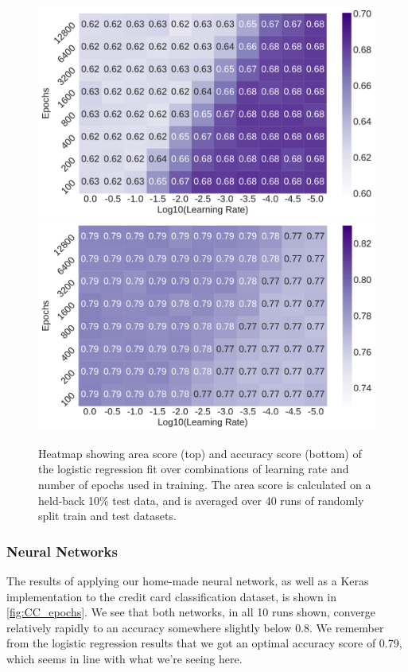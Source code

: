 \documentclass[10pt, twocolumn]{article}
\begin{document}
\begin{figure}[h]
    \centering
    \includegraphics[scale=0.4]{../figs/CC_logreg_area.pdf}
    \includegraphics[scale=0.4]{../figs/CC_logreg_acc.pdf}
    \caption{Heatmap showing area score (top) and accuracy score (bottom) of the logistic regression fit over combinations of learning rate and number of epochs used in training. The area score is calculated on a held-back 10\% test data, and is averaged over 40 runs of randomly split train and test datasets.}
    \label{fig:CC_logreg_acc_area}
\end{figure}

 
\subsubsection{Neural Networks}
The results of applying our home-made neural network, as well as a Keras implementation to the credit card classification dataset, is shown in \cref{fig:CC_epochs}. We see that both networks, in all 10 runs shown, converge relatively rapidly to an accuracy somewhere slightly below 0.8. We remember from the logistic regression results that we got an optimal accuracy score of 0.79, which seems in line with what we're seeing here.
\end{document}
